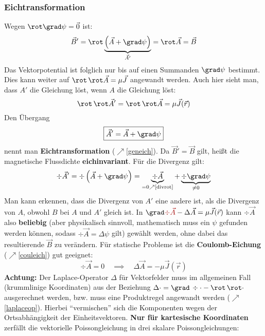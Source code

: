   \subsubsection{Eichtransformation}\label{eichtrans}
		 Wegen $\rot \grad \psi =\vec{0}$ ist:
		        $$
			        \vec{B} ' = \rot \underbrace{\left( \vec{A} + \grad \psi\right)}_{ \vec{A}'} = \rot  \vec{A} = \vec{B}
		        $$
		  Das Vektorpotential ist folglich nur bis auf einen Summanden $\grad \psi$ bestimmt.
		  Dies kann weiter auf $\rot \, \rot  \vec{A} = \mu \vec{J}$ angewandt werden. Auch hier sieht man, dass $A'$ die Gleichung löst, wenn $A$ die Gleichung löst:
		        $$
			        \rot \, \rot  \vec{A}' = \rot \, \rot  \vec{A} = \mu \vec{J}(\vec{r} )
		        $$
		   Den Übergang
		   \begin{equation}
		    \boxed{ \vec{A}' =  \vec{A} + \grad \psi}
		    \end{equation}
		     nennt man \textbf{Eichtransformation} ($\nearrow$\ref{geneich}). Da $\vec{B} '=\vec{B} $ gilt, heißt die magnetische Flussdichte \textbf{eichinvariant}. Für die Divergenz gilt:
		        $$
			        \div  \vec{A}' = \div \left( \vec{A} + \grad \psi \right) = \underbrace{\div \vec{A}}_{=0\nearrow\text{\ref{divrot}}}  + \underbrace{\div \grad \psi}_{\ne 0}
		        $$
		    Man kann erkennen, dass die Divergenz von $A'$ eine andere ist, als die Divergenz von $A$, obwohl $B$ bei $A$ und $A'$ gleich ist. In ${\grad \textcolor{red}{\div  \vec{A}} - \Delta  \vec{A}= \mu \vec{J}(\vec{r} )}$ kann $\div  \vec{A}$ also \textbf{beliebig} (aber physikalisch sinnvoll, mathematisch muss ein $\psi$ gefunden werden können, sodass $\div\vec{A}=\Delta \psi$ gilt) gewählt werden, ohne dabei das resultierende $\vec{B}$ zu verändern. Für statische Probleme ist die \textbf{Coulomb-Eichung} ($\nearrow$\ref{couleich}) gut geeignet:
			        \begin{equation}\label{vektorpot}
			        	    \boxed{\div  \vec{A} = 0} \quad \implies \quad \boxed{\Delta  \vec{A}= -\mu \vec{J}(\vec{r} )}
			        \end{equation}			        
			   \textbf{Achtung:} Der Laplace-Operator $\Delta $ für Vektorfelder muss im allgemeinen Fall (krummlinige Koordinaten) aus der Beziehung $\Delta \cdot = \grad \, \div \cdot - \rot \, \rot \cdot$ ausgerechnet werden, bzw. muss eine Produktregel angewandt werden ($\nearrow$ \ref{laplaceop}). Hierbei \enquote{vermischen} sich die Komponenten wegen der Ortsabhängigkeit der Einheitsvektoren. \textbf{Nur für kartesische Koordinaten} zerfällt die vektorielle Poissongleichung in drei skalare Poissongleichungen:
